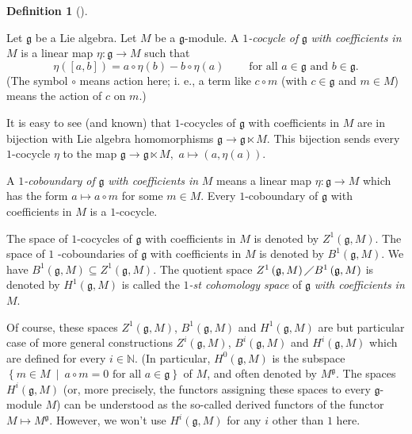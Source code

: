 \documentclass
[numbers=enddot,12pt,final,onecolumn,german,notitlepage]{scrartcl}%
\theoremstyle{definition}
\newtheorem{defi}[theo]{Definition}
\newenvironment{definition}[1][]
{\begin{defi}[#1]\begin{leftbar}}
{\end{leftbar}\end{defi}}
\begin{document}
\begin{definition}
Let $\mathfrak{g}$ be a Lie algebra. Let $M$ be a $\mathfrak{g}$-module. A
$1$\textit{-cocycle} \textit{of }$\mathfrak{g}$\textit{ with coefficients in
}$M$ is a linear map $\eta:\mathfrak{g}\rightarrow M$ such that%
\[
\eta\left(  \left[  a,b\right]  \right)  =a\circ\eta\left(  b\right)
-b\circ\eta\left(  a\right)  \ \ \ \ \ \ \ \ \ \ \text{for all }%
a\in\mathfrak{g}\text{ and }b\in\mathfrak{g}.
\]
(The symbol $\circ$ means action here; i. e., a term like $c\circ m$ (with
$c\in\mathfrak{g}$ and $m\in M$) means the action of $c$ on $m$.)

It is easy to see (and known) that $1$-cocycles of $\mathfrak{g}$ with
coefficients in $M$ are in bijection with Lie algebra homomorphisms
$\mathfrak{g}\rightarrow\mathfrak{g}\ltimes M$. This bijection sends every
$1$-cocycle $\eta$ to the map $\mathfrak{g}\rightarrow\mathfrak{g}\ltimes M,$
$a\mapsto\left(  a,\eta\left(  a\right)  \right)  $.

A $1$\textit{-coboundary of }$\mathfrak{g}$ \textit{with coefficients in }$M$
means a linear map $\eta:\mathfrak{g}\rightarrow M$ which has the form
$a\mapsto a\circ m$ for some $m\in M$. Every $1$-coboundary of $\mathfrak{g}$
with coefficients in $M$ is a $1$-cocycle.

The space of $1$-cocycles of $\mathfrak{g}$ with coefficients in $M$ is
denoted by $Z^{1}\left(  \mathfrak{g},M\right)  $. The space of $1$%
-coboundaries of $\mathfrak{g}$ with coefficients in $M$ is denoted by
$B^{1}\left(  \mathfrak{g},M\right)  $. We have $B^{1}\left(  \mathfrak{g}%
,M\right)  \subseteq Z^{1}\left(  \mathfrak{g},M\right)  $. The quotient space
$Z^{1}\left(  \mathfrak{g},M\right)  \diagup B^{1}\left(  \mathfrak{g}%
,M\right)  $ is denoted by $H^{1}\left(  \mathfrak{g},M\right)  $ is called
the $1$\textit{-st cohomology space} of $\mathfrak{g}$\textit{ with
coefficients in }$M$.

Of course, these spaces $Z^{1}\left(  \mathfrak{g},M\right)  $, $B^{1}\left(
\mathfrak{g},M\right)  $ and $H^{1}\left(  \mathfrak{g},M\right)  $ are but
particular case of more general constructions $Z^{i}\left(  \mathfrak{g}%
,M\right)  $, $B^{i}\left(  \mathfrak{g},M\right)  $ and $H^{i}\left(
\mathfrak{g},M\right)  $ which are defined for every $i\in\mathbb{N}$. (In
particular, $H^{0}\left(  \mathfrak{g},M\right)  $ is the subspace $\left\{
m\in M\ \mid\ a\circ m=0\text{ for all }a\in\mathfrak{g}\right\}  $ of $M$,
and often denoted by $M^{\mathfrak{g}}$. The spaces $H^{i}\left(
\mathfrak{g},M\right)  $ (or, more precisely, the functors assigning these
spaces to every $\mathfrak{g}$-module $M$) can be understood as the so-called
derived functors of the functor $M\mapsto M^{\mathfrak{g}}$. However, we won't
use $H^{i}\left(  \mathfrak{g},M\right)  $ for any $i$ other than $1$ here.


\end{definition}
\end{document}
